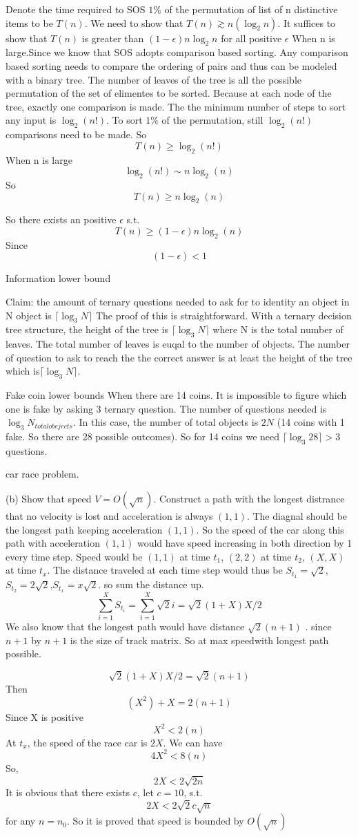 \documentclass[a4paper]{article}
\begin{document}
Denote the time required to SOS $1\%$ of the permutation of list of n distinctive items to be $T(n)$. We need to show that $T(n) \gtrsim n(\log_2 n)$. It suffices to show that $T(n)$ is greater than $(1-\epsilon)n\log_2 n$ for all positive $\epsilon$ When n is large.Since we know that SOS adopts comparison based sorting. Any comparison based sorting needs to compare the ordering of pairs and thus can be modeled with a binary tree. The number of leaves of the tree is all the possible permutation of the set of elimentes to be sorted. Because at each node of the tree, exactly one comparison is made. The the minimum number of steps to sort any input is $\log_2 (n!)$. To sort $1\%$ of the permutation, still $\log_2(n!)$ comparisons need to be made. So   
\[
T(n) \geq  \log_2(n!)
\]
When n is large
\[
\log_2(n!) \sim n\log_2(n)
\]
So
\[
T(n) \geq n\log_2(n)
\]

So there exists an positive $\epsilon$ s.t.
\[
T(n) \geq (1-\epsilon) n \log_2(n)
\]
Since
\[
(1-\epsilon) < 1
\]

 Information lower bound

Claim: the amount of ternary questions needed to ask for to identity an object in N object is $\lceil{\log_3 N}\rceil$
The proof of this is straightforward. With a ternary decision tree structure, the height of the tree is $\lceil{\log_3 N}\rceil$ where N is the total number of leaves. The total number of leaves is euqal to the number of objects. The number of question to ask to reach the the correct answer is at least the height of the tree which is$\lceil{\log_3 N}\rceil$. 

 Fake coin lower bounds
When there are 14 coins. It is impossible to figure which one is fake by asking 3 ternary question. The number of questions needed is $\log_3 N_{total obejects}$. In this case, the number of total objects is $2N$ (14 coins with 1 fake. So there are 28 possible outcomes). So for 14 coins we need $\lceil{\log_3 28}\rceil > 3$ questions.

 car race problem.

(b) Show that speed $ V = O(\sqrt{n})$. Construct a path with the longest distrance that no velocity is lost and acceleration is always $(1,1)$. The diagnal should be the longest path keeping acceleration $(1,1)$. So the speed of the car along this path with acceleration $(1,1)$ would have speed increasing in both direction by 1 every time step. Speed would be $(1,1)$ at time $t_1$, $(2,2)$ at time $t_2$, $(X,X)$ at time $t_x$. The distance traveled at each time step would thus be $S_t_1 = \sqrt{2}$, $S_t_2 = 2\sqrt{2}$,$S_t_x = x\sqrt{2}$. 
so sum the distance up.
\[
\sum_{i=1}^{X}S_t_i = \sum_{i=1}^{X}\sqrt{2}i = \sqrt{2}(1+X)X/2
\]
We also know that the longest path would have distance $\sqrt{2}(n+1)$
. since $n+1$ by $n+1$ is the size of track matrix. So at max speedwith longest path possible. 

\[
\sqrt{2}(1+X)X/2 = \sqrt{2}(n+1)
\]
Then
\[
(X^2)+X = 2(n+1)
\]
Since X is positive
\[
X^2 < 2(n)
\]
At $t_x$, the speed of the race car is $2X$. We can have
\[
4X^2 < 8(n)
\]
So,
\[
2X < 2\sqrt{2n}
\]
It is obvious that there exists $c$, let $c=10$, s.t. 
\[
2X < 2\sqrt{2}c\sqrt{n}
\]
for any $n=n_0$.
So it is proved that speed is bounded by $O(\sqrt{n})$
\end{document}
